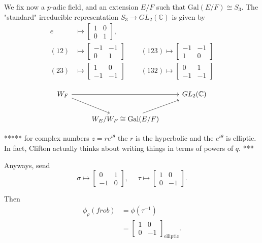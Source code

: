 \documentclass{memoir}
\newcommand{\bc}{\mathbb{C}}
\newcommand{\tx}{\text}
\theoremstyle{definition}
\begin{document}
	We fix now a $p$-adic field, and an extension $E/F$ such that $\tx{Gal}(E/F)\cong S_3$.  
	The "standard" irreducible representation $S_3\to GL_2(\bc)$ is given by 
	\begin{align*}
		e&\mapsto \begin{bmatrix}
			1 & 0\\
			0 & 1
		\end{bmatrix}, \ \ \ \ \ \ \ \ \ \ \\
	(12)&\mapsto\begin{bmatrix}
		-1 & -1 \\
		0 & 1
	\end{bmatrix} \ \ \ \ \ \ \ \ \ \ (123)\mapsto\begin{bmatrix}
	-1 & -1 \\
	1 & 0 
\end{bmatrix}\\
	(23)&\mapsto\begin{bmatrix}
		1 & 0 \\
		-1 & -1 
		\end{bmatrix} \ \ \ \ \ \ \ \ \ \ (132)\mapsto\begin{bmatrix}
		0 & 1 \\
		-1 & -1
	\end{bmatrix}
	\end{align*} 
	

	
		$$\begin{tikzcd}
		{W_F} && {GL_2(\mathbb{C})} \\
		& {W_E/W_F\cong\text{Gal}(E/F)}
		\arrow[from=1-1, to=1-3]
		\arrow[from=1-1, to=2-2]
		\arrow[from=2-2, to=1-3]
	\end{tikzcd}$$
	
	
		***** for complex numbers $z=re^{i\theta}$ the $r$ is the hyperbolic and the $e^{i\theta}$ is elliptic.  
	In fact, Clifton actually thinks about writing things in terms of powers of $q$.  ***
	
	Anyways, send
	$$\sigma\mapsto\begin{bmatrix}
		0 & 1 \\
		-1 & 0 
	\end{bmatrix}, \ \ \ \ \ \ \tau\mapsto\begin{bmatrix}
	1 & 0 \\
	0 & -1
\end{bmatrix}.$$

	Then 
	\begin{align*}
		\phi_\rho(frob)&=\phi(\tau^{-1})\\
		&=\begin{bmatrix}
			1 & 0 \\
			0 & -1
		\end{bmatrix}_{\tx{elliptic}}. 
	\end{align*}
\end{document}
